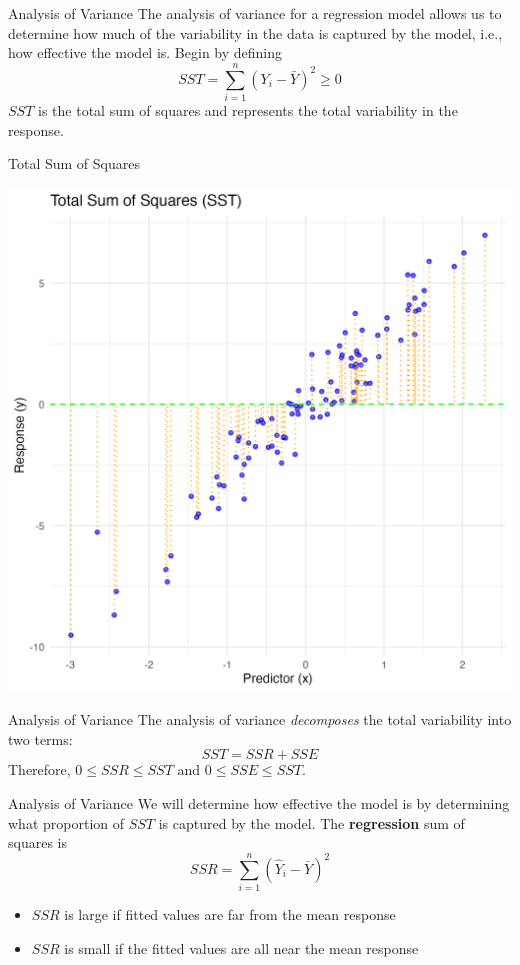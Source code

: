 \documentclass{beamer}
\begin{document}
\begin{frame}{Analysis of Variance}
    The analysis of variance for a regression model allows us to determine how much of the variability in the data is captured by the model, i.e., how effective the model is. Begin by defining 
    \begin{equation*}
        SST = \sum_{i=1}^n (Y_i - \bar{Y})^2 \geq 0
    \end{equation*}
    $SST$ is the total sum of squares and represents the total variability in the response.
\end{frame}

\begin{frame}{Total Sum of Squares}
    \begin{center}
        \includegraphics[width=.7\linewidth]{figures/sst.png}
    \end{center}
\end{frame}

\begin{frame}{Analysis of Variance}
    The analysis of variance \textit{decomposes} the total variability into two terms:
    \begin{equation*}
        SST = SSR + SSE
    \end{equation*}
    Therefore, $0 \leq SSR \leq SST$ and $0\leq SSE \leq SST$. 
\end{frame}

\begin{frame}{Analysis of Variance}
    We will determine how effective the model is by determining what proportion of $SST$ is captured by the model. The \textbf{regression} sum of squares is 
    \begin{equation*}
        SSR = \sum_{i=1}^n (\hat{Y}_i - \bar{Y})^2
    \end{equation*}
    \begin{itemize}
        \item $SSR$ is large if fitted values are far from the mean response 
        \item $SSR$ is small if the fitted values are all near the mean response
    \end{itemize}
\end{frame}
\end{document}
